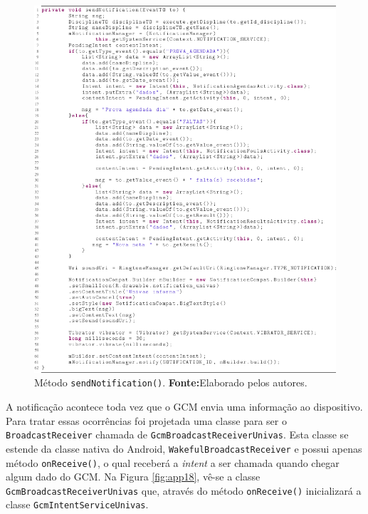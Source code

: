 	\begin{figure}[h!] 
		\centerline{\includegraphics[scale=.80]{./imagens/2_q_metodologico/4_procedimentos_resultados/42_aplicativo/send1.png}}
		\caption[Método sendNotification()]{ Método \texttt{sendNotification()}.
		\textbf{Fonte:}Elaborado pelos autores.}
		\label{fig:app17}
	\end{figure}
	
	\pagebreak
	
	\par A notificação acontece toda vez que o GCM envia uma informação ao
dispositivo. Para tratar essas ocorrências foi projetada uma classe para ser o
\texttt{BroadcastReceiver} chamada de \texttt{GcmBroadcastReceiverUnivas}. Esta
classe se estende da classe nativa do Android,
\texttt{WakefulBroadcastReceiver} e possui apenas método \texttt{onReceive()},
o qual receberá a \textit{intent} a ser chamada quando chegar algum dado do
GCM. Na Figura \ref{fig:app18}, vê-se a classe
\texttt{GcmBroadcastReceiverUnivas} que, através do método \texttt{onReceive()}
inicializará a classe \texttt{GcmIntentServiceUnivas}.

